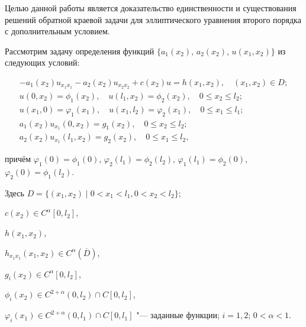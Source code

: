 Целью данной работы является доказательство единственности и существования решений обратной краевой задачи для эллиптического уравнения второго порядка с дополнительным условием.



\smallskip




Рассмотрим задачу определения функций $\{a_1(x_2)$, $a_2(x_2)$, $u(x_1,x_2)\}$ из следующих условий: 

\begin{gather}

\label{ali:1}

-a_1(x_2)u_{x_1x_1}-a_2(x_2)u_{x_2x_2}+c(x_2)u=h(x_1,x_2), \quad (x_1,x_2)\in D;

\\

\label{ali:2}

u(0,x_2)=\phi_1(x_2), \quad u(l_1,x_2)=\phi_2(x_2), \quad 0\le x_2\le l_2;

\\

\label{ali:3}

u(x_1,0)=\varphi_1(x_1), \quad u(x_1,l_2)=\varphi_2(x_1), \quad 0\le x_1\le l_1;

\\

\label{ali:4}

a_1(x_2)u_{x_1}(0,x_2)=g_1(x_2), \quad 0\le x_2\le l_2;

\\

\label{ali:5}

a_2(x_2)u_{x_1}(l_1,x_2)=g_2(x_2), \quad 0\le x_1\le l_2,

\end{gather}

причём $\varphi_1(0)=\phi_1(0)$, $\varphi_2(l_1)=\phi_2(l_2)$, $\varphi_1(l_1)=\phi_2(0)$, $\varphi_2(0)=\phi_1(l_2)$. 

Здесь $D=\{(x_1,x_2)\mid 0<x_1<l_1, 0<x_2<l_2\}$; 

$c(x_2)\in C^\alpha[0, l_2]$, 

$h(x_1,x_2)$, 

$h_{x_1 x_1}(x_1,x_2)\in C^\alpha(\overline D)$, 

$g_i(x_2)\in C^\alpha[0, l_2]$, 

$\phi_i(x_2)\in C^{2+\alpha}(0, l_2)\cap C[0, l_2]$, 

$\varphi_i(x_1)\in C^{2+\alpha}(0, l_1)\cap C[0, l_1]$ "--- заданные функции; $i=1, 2$; $0<\alpha<1$.



